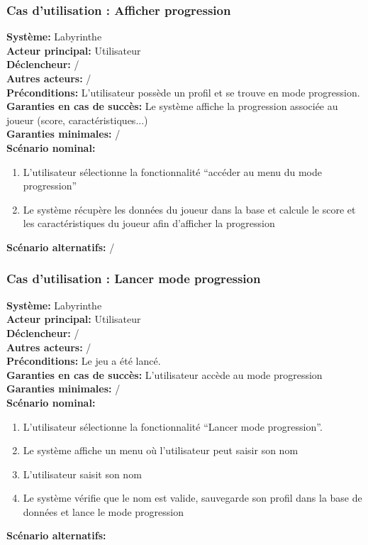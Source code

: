 \documentclass{butexFR}
\begin{document}
\subsubsection{%
Cas d’utilisation : Afficher progression}
\textbf{Système:} Labyrinthe\\
\textbf{Acteur principal:} Utilisateur\\
\textbf{Déclencheur:} /\\
\textbf{Autres acteurs:} /\\[0.25em]
\textbf{Préconditions:} %
L'utilisateur possède un profil et se trouve en mode progression.\\
\textbf{Garanties en cas de succès:} Le système affiche la progression associée au joueur (score, caractéristiques...)\\
\textbf{Garanties minimales:} /\\[0.25em]
\textbf{Scénario nominal:}
\begin{enumerate}
    \item L'utilisateur sélectionne la fonctionnalité ``accéder au menu du mode progression''
    \item Le système récupère les données du joueur dans la base et %
calcule le score et les caractéristiques du joueur afin d'afficher la progression
\end{enumerate}
\textbf{Scénario alternatifs:} /

\newpage

\subsubsection{%
Cas d’utilisation : Lancer mode progression}
\textbf{Système:} Labyrinthe\\
\textbf{Acteur principal:} Utilisateur\\
\textbf{Déclencheur:} /\\
\textbf{Autres acteurs:} /\\[0.25em]
\textbf{Préconditions:} %
Le jeu a été lancé.\\
\textbf{Garanties en cas de succès:} L'utilisateur %
accède au mode progression\\
\textbf{Garanties minimales:} /\\[0.25em]
\textbf{Scénario nominal:}
\begin{enumerate}
    \item L'utilisateur sélectionne la fonctionnalité ``Lancer mode progression''.
    \item Le système affiche un menu où l'utilisateur peut %
saisir son nom
    \item L'utilisateur %
saisit son nom
    \item Le système vérifie que le nom est valide, sauvegarde son profil dans la base de données et lance le mode progression
\end{enumerate}
\textbf{Scénario alternatifs:}
\end{document}
